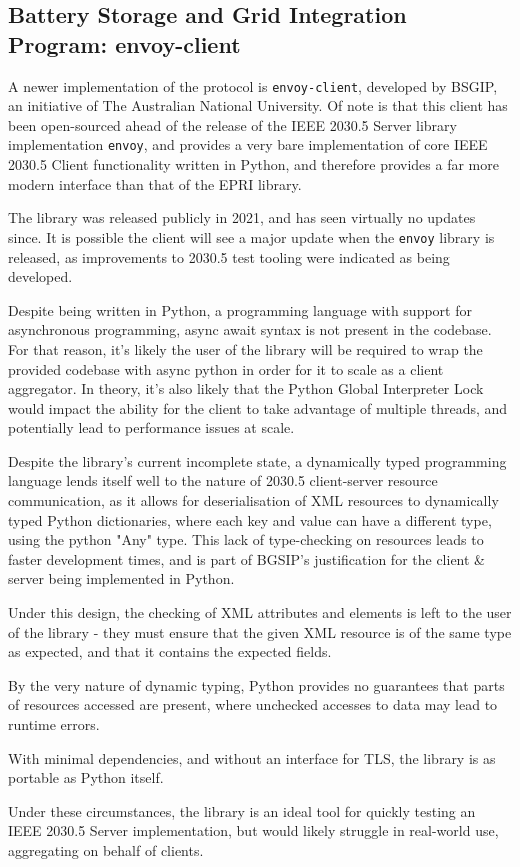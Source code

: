\subsection{Battery Storage and Grid Integration Program: envoy-client}
A newer implementation of the protocol is \texttt{envoy-client}, developed by BSGIP, an initiative of The Australian National University. Of note is that this client has been open-sourced ahead of the release of the IEEE 2030.5 Server library implementation \texttt{envoy}, and provides a very bare implementation of core IEEE 2030.5 Client functionality written in Python, and therefore provides a far more modern interface than that of the EPRI library. \cite{envoy-client}

The library was released publicly in 2021, and has seen virtually no updates since. It is possible the client will see a major update when the \texttt{envoy} library is released, as improvements to 2030.5 test tooling were indicated as being developed. \cite{DOEAdoption}


Despite being written in Python, a programming language with support for asynchronous programming, async await syntax is not present in the codebase. For that reason, it's likely the user of the library will be required to wrap the provided codebase with async python in order for it to scale as a client aggregator. In theory, it's also likely that the Python Global Interpreter Lock would impact the ability for the client to take advantage of multiple threads, and potentially lead to performance issues at scale. 

Despite the library's current incomplete state, a dynamically typed programming language lends itself well to the nature of 2030.5 client-server resource communication, as it allows for deserialisation of XML resources to dynamically typed Python dictionaries, where each key and value can have a different type, using the python "Any" type. This lack of type-checking on resources leads to faster development times, and is part of BGSIP's justification for the client \& server being implemented in Python. 

Under this design, the checking of XML attributes and elements is left to the user of the library - they must ensure that the given XML resource is of the same type as expected, and that it contains the expected fields. 

By the very nature of dynamic typing, Python provides no guarantees that parts of resources accessed are present, where unchecked accesses to data may lead to runtime errors. 

With minimal dependencies, and without an interface for TLS, the library is as portable as Python itself.

Under these circumstances, the library is an ideal tool for quickly testing an IEEE 2030.5 Server implementation, but would likely struggle in real-world use, aggregating on behalf of clients.








